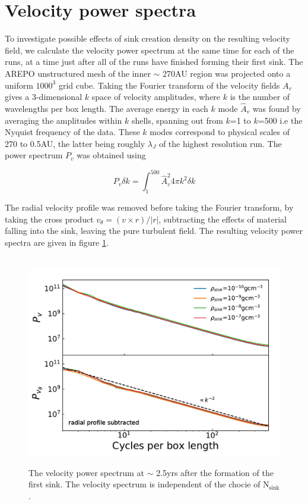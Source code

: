 \documentclass[fleqn,usenatbib]{mnras}
\begin{document}
\section{Velocity power spectra}
To investigate possible effects of sink creation density on the resulting velocity field, we calculate the velocity power spectrum at the same time for each of the runs, at a time just after all of the runs have finished forming their first sink. The AREPO unstructured mesh of the inner $\sim$ 270AU region was projected onto a uniform $1000^3$ grid cube. Taking the Fourier transform of the velocity fields $A_v$ gives a 3-dimensional $k$ space of velocity amplitudes, where $k$ is the number of wavelengths per box length. The average energy in each $k$ mode $\hat A_v$ was found by averaging the amplitudes within $k$ shells, spanning out from $k$=1 to $k$=500 i.e the Nyquist frequency of the data. These $k$ modes correspond to physical scales of 270 to 0.5AU, the latter being roughly $\lambda_J$ of the highest resolution run. The power spectrum $P_v$ was obtained using

\begin{equation}
P_v \delta k = \int_{1}^{500} \hat A_v^2 4\pi k^2 \delta k 
\end{equation}

The radial velocity profile was removed before taking the Fourier transform, by taking the cross product $v_\theta=(v \times r)/|r|$, subtracting the effects of material falling into the sink, leaving the pure turbulent field. The resulting velocity power spectra are given in figure \ref{fig:spectrum}.

\begin{figure}
	 \hbox{\hspace{-0.5cm} \includegraphics[scale=0.5]{velocity_spectrum.pdf}}
    \caption{The velocity power spectrum at $\sim$ 2.5yrs after the formation of the first sink. The velocity spectrum is independent of the chocie of N$_{\text{sink}}$.}
    \label{fig:spectrum}
\end{figure}
\end{document}
